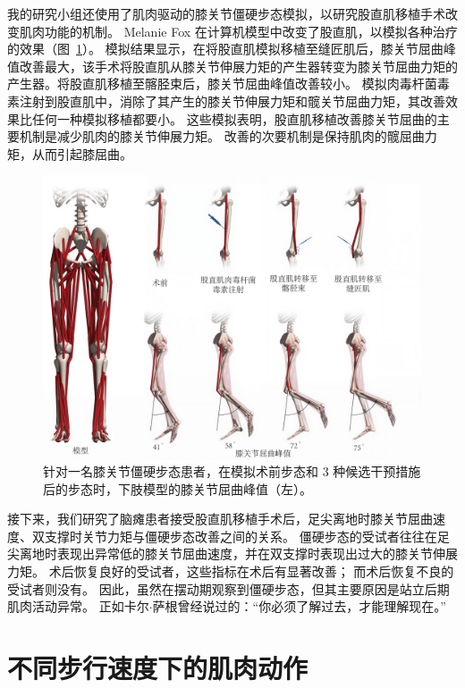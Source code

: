 我的研究小组还使用了肌肉驱动的膝关节僵硬步态模拟，以研究股直肌移植手术改变肌肉功能的机制。
Melanie Fox 在计算机模型中改变了股直肌，以模拟各种治疗的效果（图~\ref{fig:11_7}）。
模拟结果显示，在将股直肌模拟移植至缝匠肌后，膝关节屈曲峰值改善最大，该手术将股直肌从膝关节伸展力矩的产生器转变为膝关节屈曲力矩的产生器。将股直肌移植至髂胫束后，膝关节屈曲峰值改善较小。
模拟肉毒杆菌毒素注射到股直肌中，消除了其产生的膝关节伸展力矩和髋关节屈曲力矩，其改善效果比任何一种模拟移植都要小。
这些模拟表明，股直肌移植改善膝关节屈曲的主要机制是减少肌肉的膝关节伸展力矩。
改善的次要机制是保持肌肉的髋屈曲力矩，从而引起膝屈曲。


\begin{figure}[!htb]
	\centering
	\includegraphics[width=1.0\linewidth]{chap11/11_7}
	\caption{针对一名膝关节僵硬步态患者，在模拟术前步态和 3 种候选干预措施后的步态时，下肢模型的膝关节屈曲峰值（左）\cite{fox2009mechanisms}。\label{fig:11_7}}
\end{figure}


接下来，我们研究了脑瘫患者接受股直肌移植手术后，足尖离地时膝关节屈曲速度、双支撑时关节力矩与僵硬步态改善之间的关系。
僵硬步态的受试者往往在足尖离地时表现出异常低的膝关节屈曲速度，并在双支撑时表现出过大的膝关节伸展力矩。
术后恢复良好的受试者，这些指标在术后有显著改善；
而术后恢复不良的受试者则没有。
因此，虽然在摆动期观察到僵硬步态，但其主要原因是站立后期肌肉活动异常。
正如卡尔$\cdot$萨根曾经说过的：“你必须了解过去，才能理解现在。”


\section{不同步行速度下的肌肉动作}

